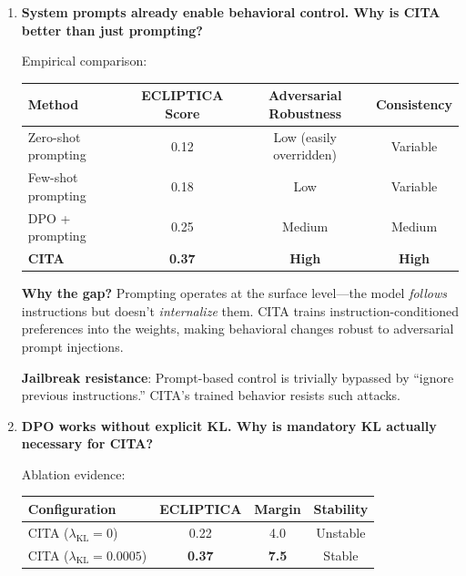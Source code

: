 \begin{enumerate}[label=\textbf{Q\arabic*.}, leftmargin=*, itemsep=8pt]
\textbf{No catastrophic safety failures observed}: CITA never produced harmful content when given safety-violating instructions in our red-teaming. The base safety training (SFT/DPO stages) provides a floor.

\vspace{4mm}

\item \textbf{System prompts already enable behavioral control. Why is CITA better than just prompting?}

 Empirical comparison:

\begin{table}[ht!]
\centering
\small
\renewcommand{\arraystretch}{1.2}
\begin{tabular}{@{}lccc@{}}
\toprule
\textbf{Method} & \textbf{ECLIPTICA Score} & \textbf{Adversarial Robustness} & \textbf{Consistency} \\
\midrule
Zero-shot prompting & 0.12 & Low (easily overridden) & Variable \\ \hline
Few-shot prompting & 0.18 & Low & Variable \\ \hline
DPO + prompting & 0.25 & Medium & Medium \\ \hline
\textbf{CITA} & \textbf{0.37} & \textbf{High} & \textbf{High} \\
\bottomrule
\end{tabular}
\end{table}

\textbf{Why the gap?} Prompting operates at the surface level---the model \textit{follows} instructions but doesn't \textit{internalize} them. CITA trains instruction-conditioned preferences into the weights, making behavioral changes robust to adversarial prompt injections.

\textbf{Jailbreak resistance}: Prompt-based control is trivially bypassed by ``ignore previous instructions.'' CITA's trained behavior resists such attacks.

\vspace{4mm}

\item \textbf{DPO works without explicit KL. Why is mandatory KL actually necessary for CITA?}

 Ablation evidence:

\begin{table}[ht!]
\centering
\small
\renewcommand{\arraystretch}{1.2}
\begin{tabular}{@{}lccc@{}}
\toprule
\textbf{Configuration} & \textbf{ECLIPTICA} & \textbf{Margin} & \textbf{Stability} \\
\midrule
CITA ($\lambda_{\text{KL}}=0$) & 0.22 & 4.0 & Unstable \\ \hline
CITA ($\lambda_{\text{KL}}=0.0005$) & \textbf{0.37} & \textbf{7.5} & Stable \\
\bottomrule
\end{tabular}
\end{table}


\end{enumerate}
